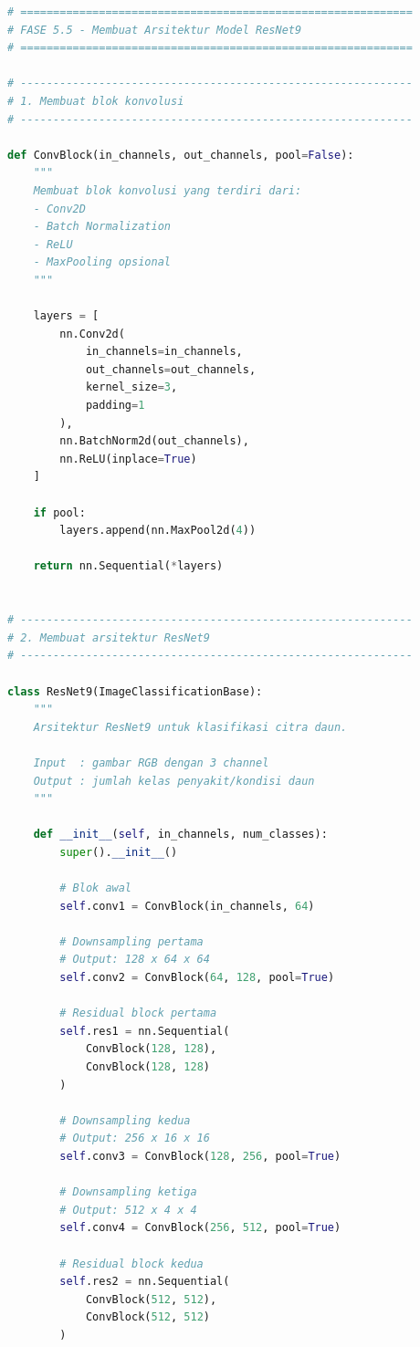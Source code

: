 \begin{lstlisting}[language=Python, caption=Membangun arsitektur ResNet9]
# ============================================================
# FASE 5.5 - Membuat Arsitektur Model ResNet9
# ============================================================

# ------------------------------------------------------------
# 1. Membuat blok konvolusi
# ------------------------------------------------------------

def ConvBlock(in_channels, out_channels, pool=False):
    """
    Membuat blok konvolusi yang terdiri dari:
    - Conv2D
    - Batch Normalization
    - ReLU
    - MaxPooling opsional
    """

    layers = [
        nn.Conv2d(
            in_channels=in_channels,
            out_channels=out_channels,
            kernel_size=3,
            padding=1
        ),
        nn.BatchNorm2d(out_channels),
        nn.ReLU(inplace=True)
    ]

    if pool:
        layers.append(nn.MaxPool2d(4))

    return nn.Sequential(*layers)


# ------------------------------------------------------------
# 2. Membuat arsitektur ResNet9
# ------------------------------------------------------------

class ResNet9(ImageClassificationBase):
    """
    Arsitektur ResNet9 untuk klasifikasi citra daun.

    Input  : gambar RGB dengan 3 channel
    Output : jumlah kelas penyakit/kondisi daun
    """

    def __init__(self, in_channels, num_classes):
        super().__init__()

        # Blok awal
        self.conv1 = ConvBlock(in_channels, 64)

        # Downsampling pertama
        # Output: 128 x 64 x 64
        self.conv2 = ConvBlock(64, 128, pool=True)

        # Residual block pertama
        self.res1 = nn.Sequential(
            ConvBlock(128, 128),
            ConvBlock(128, 128)
        )

        # Downsampling kedua
        # Output: 256 x 16 x 16
        self.conv3 = ConvBlock(128, 256, pool=True)

        # Downsampling ketiga
        # Output: 512 x 4 x 4
        self.conv4 = ConvBlock(256, 512, pool=True)

        # Residual block kedua
        self.res2 = nn.Sequential(
            ConvBlock(512, 512),
            ConvBlock(512, 512)
        )


\end{lstlisting}

